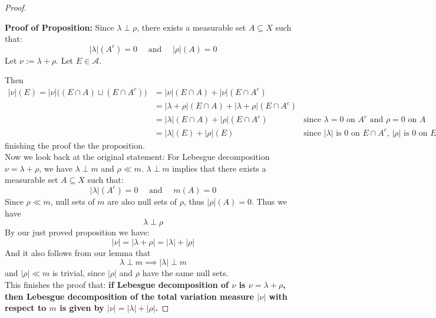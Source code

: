 \documentclass[lang=cn,11pt]{elegantbook}
\begin{document}
\begin{proof}
\begin{proposition}
\end{proposition}
\noindent \textbf{Proof of Proposition:}  Since $\lambda \perp \rho$, there exists a measurable set $A \subseteq X$ such that:
$$
|\lambda|\left(A^c\right)=0 \quad \text { and } \quad|\rho|(A)=0 
$$
Let $\nu:=\lambda+\rho$. Let $E \in \mathcal{A}$. 
\begin{comment}
 By formula derived in hw 10(1), we have:
$$
|\nu|(E)=\sup \left\{\sum_{i=1}^{\infty}\left|\nu\left(E_i\right)\right|: \bigsqcup_{1}^\infty E_i =  E \right\}
$$
Take an arbitrary measurable partition $\left\{{E}_{\mathrm{i}}\right\}$ of $E$ . Then for each $i$,
$$
\nu(E_i)=\lambda(E_i)+\rho(E_i)=\lambda(E_i \cap A)+\rho(E_i \cap A^c )\leq|\lambda(E_i \cap A)|+|\rho(E_i \cap A^c)|
$$
since $\lambda = 0$  on $A^c$ and $\rho = 0$ on $A$. 
Summing over i, 
$$
\begin{aligned}
\sum_i|\nu(E_i)| &\leq \sum_i|\lambda(E_i \cap A)|+\sum_i|\rho(E_i \cap A^c)| \\& \leq |\lambda|(E \cap A) + |\rho|(E \cap A^c) = |\lambda|(E ) + |\rho|(E)
\end{aligned}
$$Since the partition is arbitrary, this shows that \[
|\nu| (E) \leq |\lambda|(E ) + |\rho|(E)
\]   
\end{comment}
Then
\begin{align}
    |\nu |(E) = |\nu |\big((E\cap A) \sqcup (E \cap A^c) \big) &= |\nu| (E\cap A) +  |\nu| (E\cap A^c)\\
    & = |\lambda+\rho|  (E\cap A) +  |\lambda+\rho| (E\cap A^c) \\
    &= |\lambda|  (E\cap A) +  |\rho| (E\cap A^c)   \quad &\text{since $\lambda = 0$  on $A^c$ and $\rho = 0$ on $A$} \\
    & =  |\lambda|  (E ) +  |\rho| (E) \quad &\text{since $|\lambda|$ is  $0$ on $E\cap A^c$, $|\rho|$ is  $0$ on $E\cap A$}
\end{align}
finishing the proof the the proposition.\\
Now we look back at the original statement: For Lebesgue decomposition $\nu=\lambda+\rho$, we have $\lambda\perp m$ and $\rho\ll m$. 
$\lambda\perp m$ implies that  there exists a measurable set $A \subseteq X$ such that:
$$
|\lambda |(A^c) =0 \quad \text { and } \quad m (A)=0 
$$
Since $\rho\ll m$, null sets of $m$ are also null sets of $\rho$, thus $|\rho|(A) = 0$. Thus we have \[
\lambda \perp \rho
\]
By our just proved proposition we have:  $$|\nu|=|\lambda + \rho| = |\lambda|+|\rho|$$And it also follows from our lemma that \[
\lambda \perp m \implies |\lambda|\perp m
\]
and $|\rho|\ll m$ is trivial, since $|\rho|$ and $\rho$ have the same null sets.\\
This finishes the proof that: \textbf{if Lebesgue decomposition of $\nu$ is $\nu = \lambda + \rho$, then Lebesgue decomposition of the total variation measure $|\nu|$ with respect to $m$ is given by $|\nu|=|\lambda|+|\rho|$. }
\end{proof}
\end{document}
